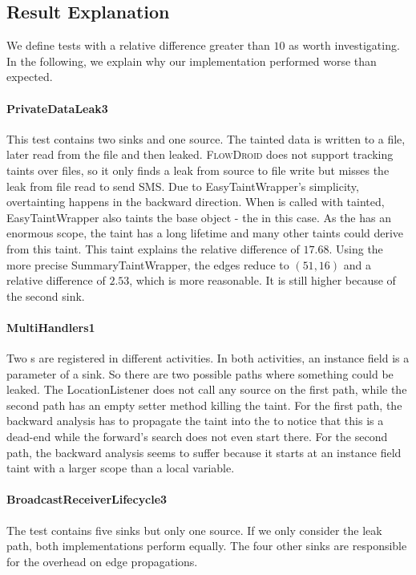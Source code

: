 \documentclass[../draft.tex]{subfiles}
\begin{document}
    \subsection{Result Explanation}
    We define tests with a relative difference greater than $10$ as worth investigating.
    In the following, we explain why our implementation performed worse than expected.

    \paragraph{PrivateDataLeak3}
    This test contains two sinks and one source.
    The tainted data is written to a file, later read from the file and then leaked.
    \textsc{FlowDroid} does not support tracking taints over files, so it only finds a leak from source to file write but misses the leak from file read to send SMS.
    Due to EasyTaintWrapper's simplicity, overtainting happens in the backward direction. When  is called with  tainted, EasyTaintWrapper also taints the base object - the  in this case.
    As the  has an enormous scope, the taint has a long lifetime and many other taints could derive from this taint.
    This taint explains the relative difference of $17.68$.
    Using the more precise SummaryTaintWrapper, the edges reduce to $(51, 16)$ and a relative difference of $2.53$, which is more reasonable.
    It is still higher because of the second sink.

    \paragraph{MultiHandlers1}
    Two s are registered in different activities.
    In both activities, an instance field is a parameter of a sink.
    So there are two possible paths where something could be leaked.
    The LocationListener does not call any source on the first path, while the second path has an empty setter method killing the taint.
    For the first path, the backward analysis has to propagate the taint into the  to notice that this is a dead-end while the forward's search does not even start there.
    For the second path, the backward analysis seems to suffer because it starts at an instance field taint with a larger scope than a local variable.

    \paragraph{BroadcastReceiverLifecycle3}
    The test contains five sinks but only one source.
    If we only consider the leak path, both implementations perform equally.
    The four other sinks are responsible for the overhead on edge propagations.
\end{document}
